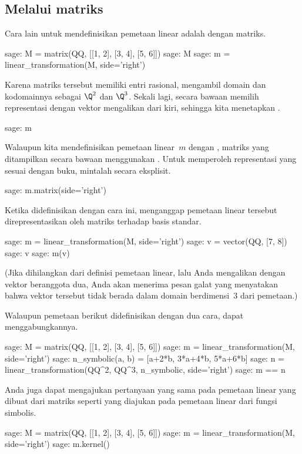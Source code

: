 \subsection{Melalui matriks}
Cara lain untuk mendefinisikan pemetaan linear adalah dengan matriks.
\begin{sagecommandline}
sage: M = matrix(QQ, [[1, 2], [3, 4], [5, 6]])
sage: M
sage: m = linear_transformation(M, side='right')
\end{sagecommandline}
Karena matriks tersebut memiliki entri rasional, \Sage{} mengambil domain
dan kodomainnya sebagai $\Q^2$ dan $\Q^3$.
Sekali lagi, secara bawaan \Sage{} memilih representasi dengan vektor
mengalikan dari kiri, sehingga kita menetapkan .
\begin{sagecommandline}
sage: m 
\end{sagecommandline}
Walaupun kita mendefinisikan pemetaan linear~$m$ dengan
\mbox{,} matriks yang ditampilkan \Sage{} secara
bawaan menggunakan .
Untuk memperoleh representasi yang sesuai dengan buku, mintalah secara eksplisit.
\begin{sagecommandline}
sage: m.matrix(side='right')
\end{sagecommandline}

Ketika didefinisikan dengan cara ini, \Sage{} menganggap pemetaan linear
tersebut direpresentasikan oleh matriks terhadap basis standar.
\begin{sagecommandline}
sage: m = linear_transformation(M, side='right')
sage: v = vector(QQ, [7, 8])
sage: v
sage: m(v)  
\end{sagecommandline}
(Jika  dihilangkan dari definisi pemetaan linear,
lalu Anda mengalikan dengan vektor beranggota dua, Anda akan menerima pesan
galat yang menyatakan bahwa vektor tersebut tidak berada dalam domain
berdimensi~$3$ dari pemetaan.)

Walaupun pemetaan berikut didefinisikan dengan dua cara, \Sage{} dapat
menggabungkannya.
\begin{sagecommandline}
sage: M = matrix(QQ, [[1, 2], [3, 4], [5, 6]])
sage: m = linear_transformation(M, side='right')
sage: n_symbolic(a, b) = [a+2*b, 3*a+4*b, 5*a+6*b]
sage: n = linear_transformation(QQ^2, QQ^3, n_symbolic, side='right')
sage: m == n  
\end{sagecommandline}
Anda juga dapat mengajukan pertanyaan yang sama pada pemetaan linear yang
dibuat dari matriks seperti yang diajukan pada pemetaan linear dari fungsi simbolis.
\begin{sagecommandline}
sage: M = matrix(QQ, [[1, 2], [3, 4], [5, 6]])
sage: m = linear_transformation(M, side='right')
sage: m.kernel() 
\end{sagecommandline}

